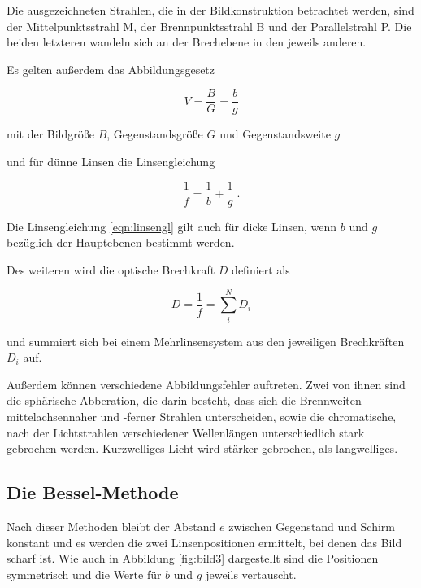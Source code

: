   Die ausgezeichneten Strahlen, die in der Bildkonstruktion betrachtet werden, sind
  der Mittelpunktsstrahl M, der Brennpunktsstrahl B und der Parallelstrahl P.
  Die beiden letzteren wandeln sich an der Brechebene in den jeweils anderen.

  Es gelten außerdem das Abbildungsgesetz 

  \begin{equation}
      V = \frac{B}{G} = \frac{b}{g}
      \label{eqn:abbgesetz}
  \end{equation}

  mit der Bildgröße $B$, Gegenstandsgröße $G$ und Gegenstandsweite $g$

  und für dünne Linsen die Linsengleichung

  \begin{equation}
      \frac{1}{f} = \frac{1}{b} + \frac{1}{g}
      \label{eqn:linsengl} \; .
  \end{equation}

Die Linsengleichung \eqref{eqn:linsengl} gilt auch für dicke Linsen, wenn $b$ und $g$
bezüglich der Hauptebenen bestimmt werden.

Des weiteren wird die optische Brechkraft $D$ definiert als

\begin{equation}
    D = \frac{1}{f} = \sum_i^N D_i
    \label{eqn:brechkraft}
\end{equation}

und summiert sich bei einem Mehrlinsensystem aus den jeweiligen Brechkräften $D_i$ auf.


Außerdem können verschiedene Abbildungsfehler auftreten. Zwei von ihnen sind
die sphärische Abberation, die darin besteht, dass sich die Brennweiten mittelachsennaher
und -ferner Strahlen unterscheiden, sowie die chromatische, nach der Lichtstrahlen verschiedener
Wellenlängen unterschiedlich stark gebrochen werden. Kurzwelliges Licht wird stärker gebrochen,
als langwelliges.

\subsection{Die Bessel-Methode}

Nach dieser Methoden bleibt der Abstand $e$ zwischen Gegenstand und Schirm konstant und
es werden die zwei Linsenpositionen ermittelt, bei denen das Bild scharf ist. Wie auch in 
Abbildung \ref{fig:bild3} dargestellt sind die Positionen symmetrisch und die Werte 
für $b$ und $g$ jeweils vertauscht.

